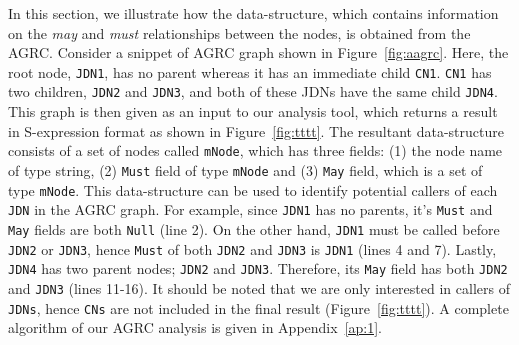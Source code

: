 In this section, we illustrate how the data-structure, which contains
information on the \textit{may} and \textit{must} relationships between
the nodes, is obtained from the AGRC. Consider a snippet of AGRC graph
shown in Figure~\ref{fig:aagrc}. Here, the root node, \texttt{JDN1}, has
no parent whereas it has an immediate child \texttt{CN1}. \texttt{CN1}
has two children, \texttt{JDN2} and \texttt{JDN3}, and both of these
JDNs have the same child \texttt{JDN4}. This graph is then given as an
input to our analysis tool, which returns a result in S-expression
format as shown in Figure~\ref{fig:tttt}. The resultant data-structure
consists of a set of nodes called \texttt{mNode}, which has three
fields: (1) the node name of type string, (2) \texttt{Must} field of
type \texttt{mNode} and (3) \texttt{May} field, which is a set of type
\texttt{mNode}. This data-structure can be used to identify potential
callers of each \texttt{JDN} in the AGRC graph. For example, since
\texttt{JDN1} has no parents, it's \texttt{Must} and \texttt{May} fields
are both \texttt{Null} (line 2).  On the other hand, \texttt{JDN1} must
be called before \texttt{JDN2} or \texttt{JDN3}, hence \texttt{Must} of
both \texttt{JDN2} and \texttt{JDN3} is \texttt{JDN1} (lines 4 and 7).
Lastly, \texttt{JDN4} has two parent nodes; \texttt{JDN2} and
\texttt{JDN3}. Therefore, its \texttt{May} field has both \texttt{JDN2}
and \texttt{JDN3} (lines 11-16). It should be noted that we are only
interested in callers of \texttt{JDNs}, hence \texttt{CNs} are not
included in the final result (Figure~\ref{fig:tttt}). A complete
algorithm of our AGRC analysis is given in Appendix~\ref{ap:1}.






